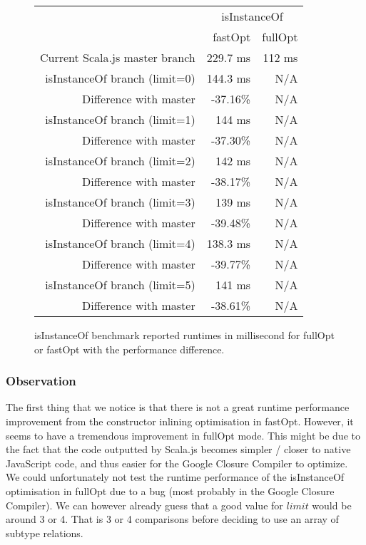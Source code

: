 \begin{figure}[H]
  \centering
  \begin{tabular}{ | r | r | r | }\hline
    & \multicolumn{2}{|c|}{isInstanceOf} \\
    & fastOpt & fullOpt \\ \hline
    Current Scala.js master branch & 229.7 ms & 112 ms \\
\hline \hline	
    isInstanceOf branch (limit=0)& 144.3 ms & N/A\\ \hline
    Difference with master & -37.16\% & N/A\\ \hline
\hline
    isInstanceOf branch (limit=1)& 144 ms & N/A\\ \hline
    Difference with master & -37.30\% & N/A\\ \hline
\hline
    isInstanceOf branch (limit=2)& 142 ms & N/A\\ \hline
    Difference with master & -38.17\% & N/A\\ \hline
\hline
    isInstanceOf branch (limit=3)& 139 ms & N/A\\ \hline
    Difference with master & -39.48\% & N/A\\ \hline
\hline
    isInstanceOf branch (limit=4)& 138.3 ms & N/A\\ \hline
    Difference with master & -39.77\% & N/A\\ \hline
\hline
    isInstanceOf branch (limit=5)& 141 ms & N/A\\ \hline
    Difference with master & -38.61\% & N/A\\ \hline
     \end{tabular}
  \captionsetup{justification=centering}
  \caption{isInstanceOf benchmark reported runtimes in millisecond for fullOpt
or fastOpt with the performance difference.}
  \label{fig:run_times_instanceof}
\end{figure}

 
\subsubsection{Observation}
The first thing that we notice is that there is not a great runtime performance
improvement from the constructor inlining optimisation in fastOpt. However, it
seems to have a tremendous improvement in fullOpt mode. This might be due to
the fact that the code outputted by Scala.js becomes simpler / closer to
native JavaScript code, and thus easier for the Google Closure Compiler to
optimize.\\
We could unfortunately not test the runtime performance of the isInstanceOf
optimisation in fullOpt due to a bug (most probably in the Google Closure
Compiler). We can however already guess that a good value for $limit$ would be
around 3 or 4. That is 3 or 4 comparisons before deciding to use an array of
subtype relations.